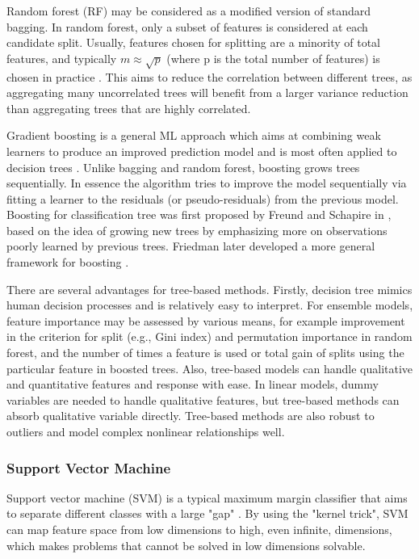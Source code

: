       Random forest (RF) may be considered as a modified version of standard bagging. In random forest, only a subset of features is considered at each candidate split. Usually, features chosen for splitting are a minority of total features, and typically $m \approx \sqrt{p}$ (where p is the total number of features) is chosen in practice \cite{james2013introduction}. This aims to reduce the correlation between different trees, as aggregating many uncorrelated trees will benefit from a larger variance reduction than aggregating trees that are highly correlated.

      Gradient boosting is a general ML approach which aims at combining weak learners to produce an improved prediction model and is most often applied to decision trees \cite{friedman2001greedy}. Unlike bagging and random forest, boosting grows trees sequentially. In essence the algorithm tries to improve the model sequentially via fitting a learner to the residuals (or pseudo-residuals) from the previous model. Boosting for classification tree was first proposed by Freund and Schapire in \cite{freund1995desicion}, based on the idea of growing new trees by emphasizing more on observations poorly learned by previous trees. Friedman later developed a more general framework for boosting \cite{friedman2001greedy}.

      There are several advantages for tree-based methods. Firstly, decision tree mimics human decision processes and is relatively easy to interpret. For ensemble models, feature importance may be assessed by various means, for example improvement in the criterion for split (e.g., Gini index) and permutation importance in random forest, and the number of times a feature is used or total gain of splits using the particular feature in boosted trees. Also, tree-based models can handle qualitative and quantitative features and response with ease. In linear models, dummy variables are needed to handle qualitative features, but tree-based methods can absorb qualitative variable directly. Tree-based methods are also robust to outliers and model complex nonlinear relationships well.

    \subsubsection{Support Vector Machine}
      Support vector machine (SVM) is a typical maximum margin classifier that aims to separate different classes with a large "gap" \cite{cortes1995support}. By using the "kernel trick", SVM can map feature space from low dimensions to high, even infinite, dimensions, which makes problems that cannot be solved in low dimensions solvable.
      
